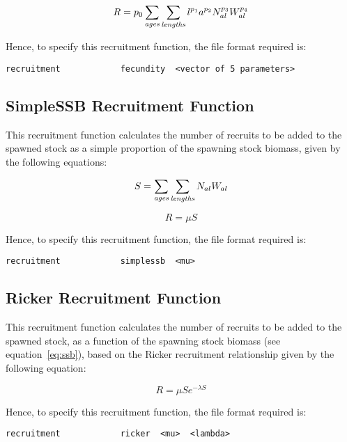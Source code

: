 \documentclass[10pt,twoside]{book}
\begin{document}
\begin{equation}\label{eq:rec1}
R = p_{0} \sum_{\it ages}\sum_{\it lengths} l ^{p_{1}} a ^{p_{2}} N_{al} ^{p_{3}} W_{al} ^{p_{4}}
\end{equation}

Hence, to specify this recruitment function, the file format required is:

{\small\begin{verbatim}
recruitment            fecundity  <vector of 5 parameters>
\end{verbatim}}

\subsection{SimpleSSB Recruitment Function}
This recruitment function calculates the number of recruits to be added to the spawned stock as a simple proportion of the spawning stock biomass, given by the following equations:

\begin{equation}\label{eq:ssb}
S = \sum_{\it ages}\sum_{\it lengths} N_{al} W_{al}
\end{equation}

\begin{equation}\label{eq:rec2}
R = \mu S
\end{equation}

Hence, to specify this recruitment function, the file format required is:

{\small\begin{verbatim}
recruitment            simplessb  <mu>
\end{verbatim}}

\subsection{Ricker Recruitment Function}
This recruitment function calculates the number of recruits to be added to the spawned stock, as a function of the spawning stock biomass (see equation~\ref{eq:ssb}), based on the Ricker recruitment relationship given by the following equation:

\begin{equation}\label{eq:rec3}
R = \mu S e ^{-\lambda S}
\end{equation}

Hence, to specify this recruitment function, the file format required is:

{\small\begin{verbatim}
recruitment            ricker  <mu>  <lambda>
\end{verbatim}}
\end{document}

